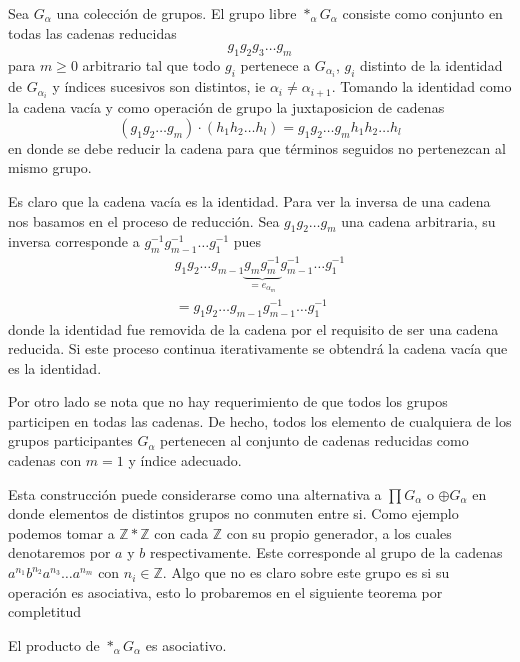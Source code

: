 \begin{definicion} \label{def:prod-libre}
  Sea \(G_\alpha\) una colección de grupos. El grupo libre \(*_\alpha
  G_\alpha \) consiste como conjunto en todas las cadenas reducidas
  \[ g_1 g_2 g_3 \dots g_m \]
  para \(m \geq 0\) arbitrario tal que todo \(g_i\) pertenece a
  \(G_{\alpha_i}\), \(g_i\) distinto de la identidad de
  \(G_{\alpha_i}\) y índices sucesivos son distintos, ie \(\alpha_i \neq
  \alpha_{i + 1}\). Tomando la identidad como la cadena vacía y como
  operación de grupo la juxtaposicion de cadenas
  \[ (g_1 g_2 \dots g_m ) \cdot (h_1 h_2 \dots h_l) = g_1 g_2 \dots g_m
    h_1 h_2 \dots h_l \]
  en donde se debe reducir la cadena para que términos seguidos no
  pertenezcan al mismo grupo.
\end{definicion}
\begin{acotacion}
  Es claro que la cadena vacía es la identidad. Para ver la inversa de
  una cadena nos basamos en el proceso de reducción. Sea \(g_1 g_2 \dots
  g_m\) una cadena arbitraria, su inversa corresponde a \(g_m^{-1}
  g_{m-1}^{-1} \dots g_1^{-1}\) pues
  \begin{gather*}
    g_1 g_2 \dots g_{m-1} \underbrace{g_m g_m^{-1}}_{= e_{\alpha_m}}
      g_{m-1}^{-1} \dots g_1^{-1} \\
    = g_1 g_2 \dots g_{m-1} g_{m-1}^{-1} \dots g_1^{-1}
  \end{gather*}
  donde la identidad fue removida de la cadena por el requisito de ser
  una cadena reducida. Si este proceso continua iterativamente se
  obtendrá la cadena vacía que es la identidad.

  Por otro lado se nota que no hay requerimiento de que todos los grupos
  participen en todas las cadenas. De hecho, todos los elemento de
  cualquiera de los grupos participantes \(G_\alpha\) pertenecen al
  conjunto de cadenas reducidas como cadenas con \(m = 1\) y índice
  adecuado.
\end{acotacion}
Esta construcción puede considerarse como una alternativa a \(\prod
G_\alpha\) o \(\oplus G_\alpha\) en donde elementos de distintos grupos
no conmuten entre si. Como ejemplo podemos tomar a \(\mathbb Z * \mathbb
Z\) con cada \(\mathbb Z\) con su propio generador, a los cuales
denotaremos por \(a\) y \(b\) respectivamente. Este corresponde al grupo
de la cadenas \(a^{n_1} b^{n_2} a^{n_3} \dots a^{n_m}\) con \(n_i \in
\mathbb Z \). Algo que no es claro sobre este grupo es si
su operación es asociativa, esto lo probaremos en el siguiente teorema
por completitud
\begin{teorema}
  El producto de \(*_\alpha G_\alpha\) es asociativo.
\end{teorema}

